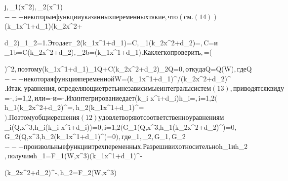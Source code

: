j$, $\varphi_1(x^2)$, $\varphi_2(x^1)$ --- некоторые функции указанных 


переменных такие, что (см. (14)) $(k_1x^1+d_1)(k_2x^2+ 


d_2)\varphi_1\varphi_2=1$. Это дает $\varphi_2(k_1x^1+d_1)=C$, 


$\varphi_1(k_2x^2+d_2)=$, $C=\const{}$ и 


$\mu_1b=C(k_2x^2+d_2)$, $\mu_2b=(k_1x^1+d_1)$. 


 


Как легко проверить, $=\big( 


\big)^2$, поэтому 


$(k_1x^1+d_1)\partial_1Q+C(k_2x^2+d_2)\partial_2Q=0$, 


откуда $Q=Q(W)$, где $Q$ --- некоторая функция переменной 


$W=(k_1x^1+d_1)^{}/(k_2x^2+d_2)^{}$. 


 


Итак, уравнения, определяющие третьи независимые интегралы систем (13), 


приводятся к виду $=-$, 


$i=1,2$, или $=-$ и 


$=-$. Их интегрирование дает 


$(k_i x^i+d_i)h_i=\const$, $i=1,2$ 


($h_1(k_2x^2+d_2)^{}=\const$, 


$h_2(k_1x^1+d_1)^{}=\const$). Поэтому общие решения (12) 


удовлетворяют соответственно уравнениям $\Phi_i(Q,x^3,h_i(k_i x^i+d_i))=0$, 


$i=1,2$ ($G_1(Q,x^3,h_1(k_2x^2+d_2)^{})=0$, 


$G_2(Q,x^3,h_2(k_1x^1+d_1)^{})=0$), где $\Phi_1$, 


$\Phi_2$, $G_1$, $G_2$ --- произвольные функции трех переменных. Разрешив 


их относительно $h_1$ и $h_2$, получим 


$h_1=F_1(W,x^3)(k_1x^1+d_1)^{-} 


(k_2x^2+d_2)^{-}$, $h_2=F_2(W,x^3) 



